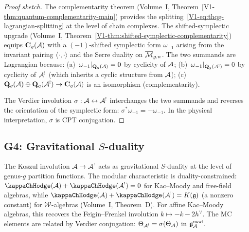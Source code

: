 \begin{proof}[Proof sketch]
The complementarity theorem (Volume~I, Theorem~\ref{V1-thm:quantum-complementarity-main})
provides the splitting~\eqref{V1-eq:thqg-lagrangian-splitting} at the level
of chain complexes. The shifted-symplectic upgrade
(Volume~I, Theorem~\ref{V1-thm:shifted-symplectic-complementarity}) equips
$\mathbf{C}_g(\mathcal{A})$ with a $(-1)$-shifted symplectic form $\omega_{-1}$
arising from the invariant pairing $\langle\cdot,\cdot\rangle$ and the
Serre duality on $\overline{\mathcal M}_{g,n}$. The two summands are Lagrangian because:
(a)~$\omega_{-1}|_{\mathbf{Q}_g(\mathcal{A})} = 0$ by cyclicity of $\mathcal{A}$;
(b)~$\omega_{-1}|_{\mathbf{Q}_g(\mathcal{A}^!)} = 0$ by cyclicity of $\mathcal{A}^!$
(which inherits a cyclic structure from $\mathcal{A}$);
(c)~$\mathbf{Q}_g(\mathcal{A}) \oplus \mathbf{Q}_g(\mathcal{A}^!) \to \mathbf{C}_g(\mathcal{A})$
is an isomorphism (complementarity).

The Verdier involution $\sigma: \mathcal{A} \leftrightarrow \mathcal{A}^!$ interchanges
the two summands and reverses the orientation of the symplectic form:
$\sigma^*\omega_{-1} = -\omega_{-1}$. In the physical interpretation,
$\sigma$ is CPT conjugation.
\end{proof}


\subsection{G4: Gravitational $S$-duality}

\begin{theorem}
The Koszul involution $\mathcal{A} \mapsto \mathcal{A}^!$ acts as gravitational $S$-duality
at the level of genus-$g$ partition functions. The modular characteristic
is duality-constrained: $\kappaChHodge(\cA) + \kappaChHodge(\cA^!) = 0$ for Kac--Moody and free-field algebras, while $\kappaChHodge(\cA) + \kappaChHodge(\cA^!) = K(\fg)$ (a nonzero constant) for $\mathcal{W}$-algebras (Volume~I, Theorem~D).
For affine Kac--Moody algebras, this recovers the Feigin--Frenkel involution
$k \mapsto -k - 2h^\vee$. The MC elements are related by Verdier conjugation:
$\Theta_{\mathcal{A}^!} = \sigma(\Theta_{\mathcal{A}})$ in $\mathfrak{g}_{\mathcal{A}}^{\mathrm{mod}}$.
\end{theorem}

